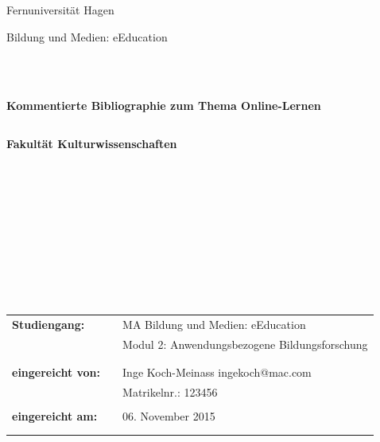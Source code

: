 \documentclass[12pt, bibliography=totoc]{scrartcl}
\begin{document}
\renewcommand\finalandcomma{\addcomma}

\begin{titlepage}
\thispagestyle{empty}
\begin{center}
\color{blue}\Large{Fernuniversität Hagen}\\
\end{center}


\begin{center}
\Large{Bildung und Medien: eEducation}
\end{center}
\begin{verbatim}



\end{verbatim}
\begin{center}
\textbf{\Large{Kommentierte Bibliographie zum Thema Online-Lernen}}
\end{center}
\begin{verbatim}

\end{verbatim}
\begin{center}
\textbf{Fakultät Kulturwissenschaften}
\end{center}
\begin{verbatim}










\end{verbatim}

\begin{flushleft}
\begin{tabular}{lll}
\textbf{Studiengang:} & & MA Bildung und Medien: eEducation\\
& & Modul 2: Anwendungsbezogene Bildungsforschung\\
& & \\
& & \\
\textbf{eingereicht von:} & & {\color{magenta} Inge Koch-Meinass \flq{}ingekoch@mac.com\frq{}}\\
& & {\color{magenta}Matrikelnr.: 123456 }\\
& & \\
\textbf{eingereicht am:} & & 06. November 2015\\
& & \\
& & \\
\end{tabular}
\end{flushleft}

\end{titlepage}
\end{document}
